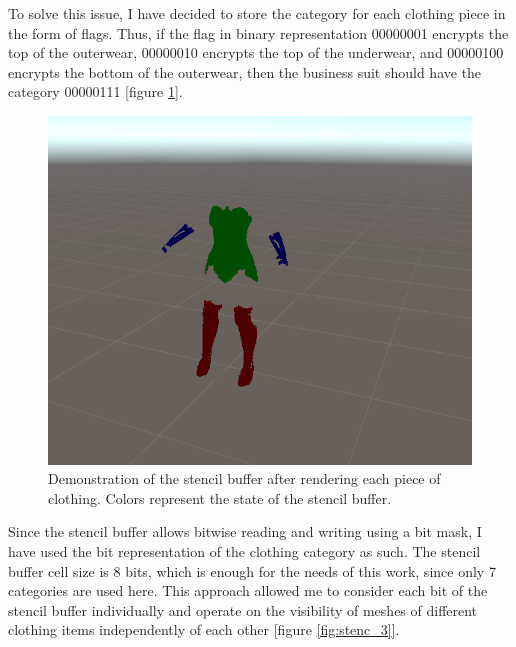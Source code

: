 \documentclass[a4paper]{report}
\begin{document}
To solve this issue, I have decided to store the category for each clothing piece in the form of flags. Thus, if the flag in binary representation 00000001 encrypts the top of the outerwear, 00000010 encrypts the top of the underwear, and 00000100 encrypts the bottom of the outerwear, then the business suit should have the category 00000111 [figure \ref{fig:stenc_2}].

\begin{figure}[H]

    \centering
    \includegraphics[width=\textwidth , keepaspectratio]{images/ClothesDemos/Screenshot 2021-05-08 215143.png}
    \caption{Demonstration of the stencil buffer after rendering each piece of clothing. Colors represent the state of the stencil buffer.}
    \label{fig:stenc_2}
\end{figure}

Since the stencil buffer allows bitwise reading and writing using a bit mask, I have used the bit representation of the clothing category as such. The stencil buffer cell size is 8 bits, which is enough for the needs of this work, since only 7 categories are used here. This approach allowed me to consider each bit of the stencil buffer individually and operate on the visibility of meshes of different clothing items independently of each other [figure \ref{fig:stenc_3}].
\end{document}
